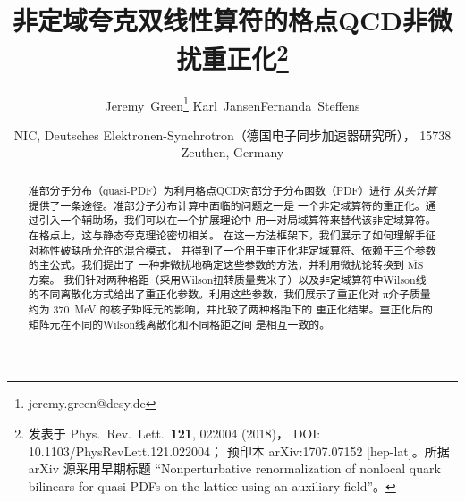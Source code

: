 \documentclass[11pt]{ctexart}
\newcommand{\MSbar}{\overline{\text{MS}}}
\begin{document}
\title{非定域夸克双线性算符的格点QCD非微扰重正化\thanks{
  发表于 Phys.\ Rev.\ Lett.\ \textbf{121}, 022004 (2018)，
  DOI: 10.1103/PhysRevLett.121.022004；
  预印本 arXiv:1707.07152 [hep-lat]。所据 arXiv 源采用早期标题
  ``Nonperturbative renormalization of nonlocal quark bilinears for
  quasi-PDFs on the lattice using an auxiliary field''。}}
\author{Jeremy~Green\thanks{jeremy.green@desy.de}\quad
        Karl~Jansen\quad Fernanda~Steffens}
\date{NIC, Deutsches Elektronen-Synchrotron（德国电子同步加速器研究所），
      15738 Zeuthen, Germany}

\maketitle

\begin{abstract}
  准部分子分布（quasi-PDF）为利用格点QCD对部分子分布函数（PDF）进行
  \emph{从头计算}提供了一条途径。准部分子分布计算中面临的问题之一是
  一个非定域算符的重正化。通过引入一个辅助场，我们可以在一个扩展理论中
  用一对局域算符来替代该非定域算符。在格点上，这与静态夸克理论密切相关。
  在这一方法框架下，我们展示了如何理解手征对称性破缺所允许的混合模式，
  并得到了一个用于重正化非定域算符、依赖于三个参数的主公式。我们提出了
  一种非微扰地确定这些参数的方法，并利用微扰论转换到 $\MSbar$ 方案。
  我们针对两种格距（采用Wilson扭转质量费米子）以及非定域算符中Wilson线
  的不同离散化方式给出了重正化参数。利用这些参数，我们展示了重正化对
  π介子质量约为 370~MeV 的核子矩阵元的影响，并比较了两种格距下的
  重正化结果。重正化后的矩阵元在不同的Wilson线离散化和不同格距之间
  是相互一致的。
\end{abstract}



\end{document}
